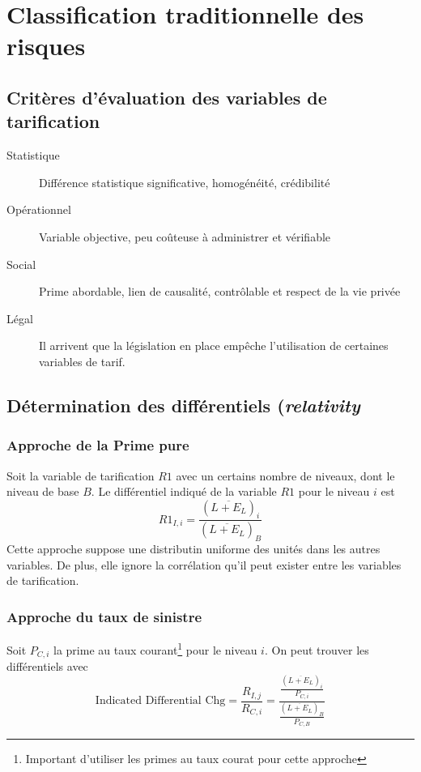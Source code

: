 \section{Classification traditionnelle des risques}

\subsection{Critères d'évaluation des variables de tarification}
\begin{description}
\item[Statistique] Différence statistique significative, homogénéité, crédibilité
\item[Opérationnel] Variable objective, peu coûteuse à administrer et vérifiable
\item[Social] Prime abordable, lien de causalité, contrôlable et respect de la vie privée
\item[Légal] Il arrivent que la législation en place empêche l'utilisation de certaines variables de tarif.
\end{description}

\subsection{Détermination des différentiels (\textit{relativity}}

\subsubsection{Approche de la Prime pure}
\label{sssec:diff-approche-pp}
Soit la variable de tarification $R1$ avec un certains nombre de niveaux, dont le niveau de base $B$. Le différentiel indiqué de la variable $R1$ pour le niveau $i$ est
\begin{equation}
\label{eq:diff-approche-pp}
R1_{I, i} = \frac{(\overline{L + E_L})_i}{(\overline{L + E_L})_B}
\end{equation}
Cette approche suppose une distributin uniforme des unités dans les autres variables. De plus, elle ignore la corrélation qu'il peut exister entre les variables de tarification.

\subsubsection{Approche du taux de sinistre}
Soit $P_{C, i}$ la prime au taux courant\footnote{Important d'utiliser les primes au taux courat pour cette approche} pour le niveau $i$. On peut trouver les différentiels avec
\begin{equation}
\label{eq:diff-approche-lr}
\text{Indicated Differential Chg} = \frac{R_{I, j}}{R_{C, i}} = \frac{\frac{(\overline{L + E_L})_i}{P_{C, i}}}{\frac{(\overline{L + E_L})_B}{P_{C, B}}}
\end{equation}

